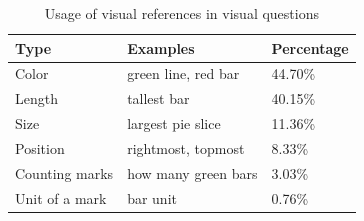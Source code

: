 \begin{table}[h]
\centering
\small
{}
\vspace{-2mm}
\caption{
    \small ChartQA benchmark statistics.
}
\vspace{-2mm}
\label{dataset-token-stats}
\end{table}


 \begin{table}[h!]
\centering
\small
\begin{tabular}{lll}
\toprule
Type  & Examples & Percentage   \\
\hline
Color & green line, red bar & 44.70\% \\
Length & tallest bar & 40.15\% \\
Size & largest pie slice & 11.36\% \\
Position & rightmost, topmost & 8.33\% \\
Counting marks & how many green bars & 3.03\% \\
Unit of a mark & bar unit & 0.76\% \\
\bottomrule
\end{tabular}
\caption{
    Usage of visual references in visual questions
}
\label{visual-ref-stats}
\end{table}

